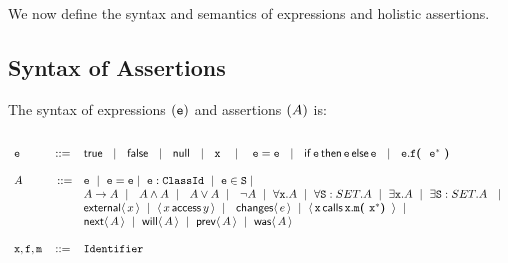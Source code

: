We now define the syntax and semantics of expressions and holistic assertions.


 \subsection{Syntax of Assertions}

\begin{definition}[Assertions] The syntax of   expressions $({\mbox{\tt{e}}})$ and assertions $(A)$ is:
\label{def:assertions}

 $\begin{array}{lcl}
  ~  \\
 \SE  &\BBC&    \kwN{true}   ~\SOR~  \kwN{false}   ~\SOR~  \kwN{null}  ~\SOR~  \x  \   ~\SOR~  
     \   \SE=\SE    ~\SOR~ \kwN{if}\, \SE\,   \kwN{then}\,  \SE\,    \kwN{else}\, \SE    ~\SOR~  \SE.\f\lp\ \SE^* \ \rp\\
     \\
 \A &\ \BBC   &   \SE \   \mid \  \SE=\SE  \mid \   \SE:\prg{ClassId}  \ \mid \
    \SE\in\prg{S}   \mid  \  \\
    & &  \A \rightarrow \A  \ \mid\  \     \A \wedge \A  \ \mid\  \ \A \vee \A  \ \mid\  \ \neg A   \ \mid \  \forall \x.\A  \ \mid \  \forall \prg{S}:SET.\A  \ \mid  \  \exists \x.\A  \ \mid \  \exists \prg{S}:SET.\A  \  \ \mid\   \\
 &    & \External x   \ \mid\   \CanAccess x y \ \mid\  \ \Changes e \ \mid\  \Calls {\prg{x}}  {\prg{m}} {\prg{x}}  {\prg{x}^*} \ \mid\  \\  
 &    &  \Next \A  \ \mid \   \Future \A \ \mid \  \Prev \A    \ \mid \  \Past \A \\
 \\
 \x, \f, \m &\BBC&  \prg{Identifier}  ~ \\
\end{array}$
\end{definition}
 

